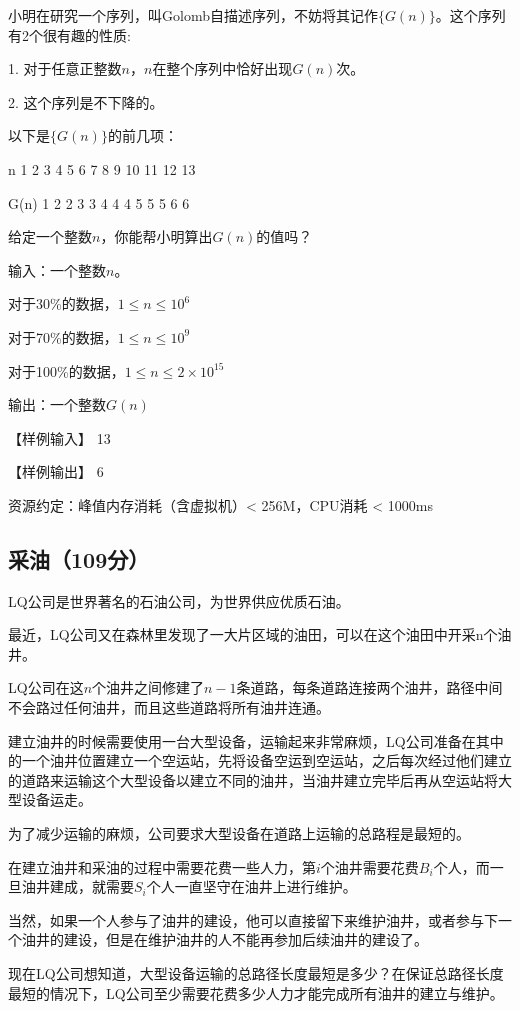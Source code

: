 \documentclass[a4paper, 12pt, twocolumn]{ctexart}
\begin{document}
	小明在研究一个序列，叫Golomb自描述序列，不妨将其记作$\{G(n)\}$。这个序列有2个很有趣的性质:
	
	1. 对于任意正整数$n$，$n$在整个序列中恰好出现$G(n)$次。
	
	2. 这个序列是不下降的。
	
	以下是$\{G(n)\}$的前几项：
	
	n	1	2	3	4	5	6	7	8	9	10	11	12	13
	
	G(n)	1	2	2	3	3	4	4	4	5	5	5	6	6
	
	给定一个整数$n$，你能帮小明算出$G(n)$的值吗？
	
	输入：一个整数$n$。  
	
	对于30\%的数据，$1\leq n\leq 10^6 $
	 
	对于70\%的数据，$1\leq n\leq 10^9$
	
	对于100\%的数据，$1\leq n\leq 2\times10^{15}$  
	
	输出：一个整数$G(n)$
	
	
	【样例输入】
	13
	
	【样例输出】
	6
	
	资源约定：峰值内存消耗（含虚拟机）< 256M，CPU消耗  < 1000ms
	

	
	\subsection{采油（109分）}
	
	LQ公司是世界著名的石油公司，为世界供应优质石油。
	
	最近，LQ公司又在森林里发现了一大片区域的油田，可以在这个油田中开采n个油井。
	
	LQ公司在这$n$个油井之间修建了$n-1$条道路，每条道路连接两个油井，路径中间不会路过任何油井，而且这些道路将所有油井连通。
	
	建立油井的时候需要使用一台大型设备，运输起来非常麻烦，LQ公司准备在其中的一个油井位置建立一个空运站，先将设备空运到空运站，之后每次经过他们建立的道路来运输这个大型设备以建立不同的油井，当油井建立完毕后再从空运站将大型设备运走。
	
	为了减少运输的麻烦，公司要求大型设备在道路上运输的总路程是最短的。
	
	在建立油井和采油的过程中需要花费一些人力，第$i$个油井需要花费$B_i$个人，而一旦油井建成，就需要$S_i$个人一直坚守在油井上进行维护。
	
	当然，如果一个人参与了油井的建设，他可以直接留下来维护油井，或者参与下一个油井的建设，但是在维护油井的人不能再参加后续油井的建设了。
	
	现在LQ公司想知道，大型设备运输的总路径长度最短是多少？在保证总路径长度最短的情况下，LQ公司至少需要花费多少人力才能完成所有油井的建立与维护。
	
\end{document}
